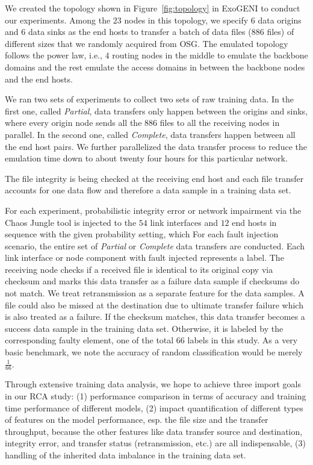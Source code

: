 We created the topology shown in Figure~\ref{fig:topology} in ExoGENI to conduct our experiments. Among the $23$ nodes in this topology, we specify $6$ data origins and $6$ data sinks as the end hosts 
to transfer a batch of data files ($886$ files) of different sizes that we randomly acquired from OSG. The emulated topology follows the power law, i.e., $4$ routing 
nodes in the middle to emulate the backbone domains and the rest emulate the access domains in between the backbone nodes and the end hosts. 

We ran two sets of experiments to collect two sets of raw training data. In the first one, called {\it Partial},
data transfers only happen between the origins and sinks, where every origin node sends all the $886$ files 
to all the receiving nodes in parallel. In the second one, called {\it Complete}, data transfers happen between all the end host pairs. 
We further parallelized the data transfer process to reduce the emulation time down to about twenty four hours for this particular network.  

The file integrity is being checked at the receiving end host and each file transfer accounts for one data flow and therefore a
 data sample in a training data set.

For each experiment, probabilistic integrity error or network impairment via the Chaos Jungle tool is injected to the $54$ link interfaces and $12$ end hosts in sequence with the given probability setting, which 
For each fault injection scenario, the entire set of {\it Partial} or {\it Complete} data transfers are conducted. Each link interface or node component with fault injected represents a label.  
The receiving node checks if a received file is identical to its original copy via checksum and marks this data transfer as a failure data sample if checksums do not match. 
We treat retransmission as a separate feature for the data samples.  A file could also be missed at the destination due to ultimate transfer failure which is also treated as a failure. 
If the checksum matches, this data transfer becomes a success data sample in the training data set. Otherwise, it is labeled by the corresponding faulty element, one of the total $66$ labels in this study. 
As a very basic benchmark, we note the accuracy of random classification would be merely $\frac{1}{66}$. 

Through extensive training data analysis, we hope to achieve three import goals in our RCA study:  (1) performance comparison in terms of accuracy and training time performance of different models, 
(2) impact quantification of different types of features on the model performance, esp. the file size and the transfer throughput, because the other features like data transfer source and destination, integrity error, 
and transfer status (retransmission, etc.) are all indispensable, (3) handling of the inherited data imbalance in the training data set.  

